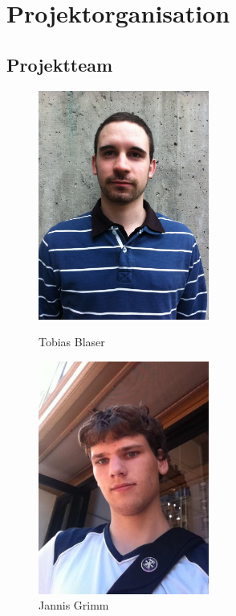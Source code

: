 \chapter{Projektorganisation}

\section{Projektteam}
\begin{figure}[H]
	\begin{minipage}[b]{0.5\linewidth}
		\includegraphics[width=0.5\textwidth]{../projektplan/img/tobias.jpg}
		\centering
		\caption{Tobias Blaser}
		\label{fig:tobias}
	\end{minipage}
	\begin{minipage}[b]{0.5\linewidth}
		\includegraphics[width=0.5\textwidth]{../projektplan/img/jannis.jpg}
		\centering
		\caption{Jannis Grimm}
		\label{fig:jannis}
	\end{minipage}
\end{figure}

